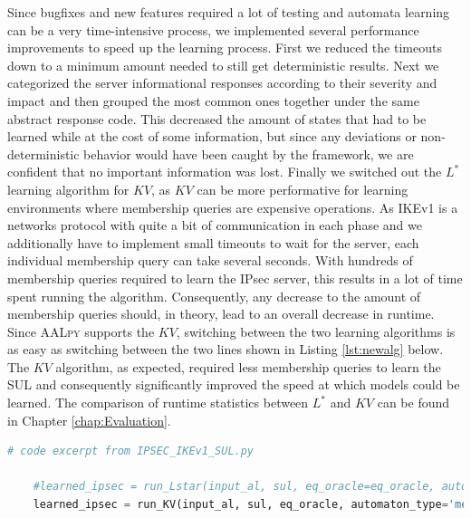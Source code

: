 Since bugfixes and new features required a lot of testing and automata learning can be a very time-intensive process, we implemented several performance improvements to speed up the learning process. First we reduced the timeouts down to a minimum amount needed to still get deterministic results. Next we categorized the server informational responses according to their severity and impact and then grouped the most common ones together under the same abstract response code. This decreased the amount of states that had to be learned while at the cost of some information, but since any deviations or non-deterministic behavior would have been caught by the framework, we are confident that no important information was lost. Finally we switched out the $L^*$ learning algorithm for $KV$, as $KV$ can be more performative for learning environments where membership queries are expensive operations. As IKEv1 is a networks protocol with quite a bit of communication in each phase and we additionally have to implement small timeouts to wait for the server, each individual membership query can take several seconds. With hundreds of membership queries required to learn the IPsec server, this results in a lot of time spent running the algorithm. Consequently, any decrease to the amount of membership queries should, in theory, lead to an overall decrease in runtime. Since \textsc{AALpy} supports the $KV$, switching between the two learning algorithms is as easy as switching between the two lines shown in Listing \ref{lst:newalg} below. The $KV$ algorithm, as expected, required less membership queries to learn the SUL and consequently significantly improved the speed at which models could be learned. The comparison of runtime statistics between $L^*$ and $KV$ can be found in Chapter \ref{chap:Evaluation}.

\begin{lstlisting}[float=ht, caption=Switching Learning Algorithms, label=lst:newalg, numbers=none, language=python]
	# code excerpt from IPSEC_IKEv1_SUL.py
	
	#learned_ipsec = run_Lstar(input_al, sul, eq_oracle=eq_oracle, automaton_type='mealy', cache_and_non_det_check=True, print_level=3)
	learned_ipsec = run_KV(input_al, sul, eq_oracle, automaton_type='mealy', print_level=3, cex_processing='rs')
\end{lstlisting}
